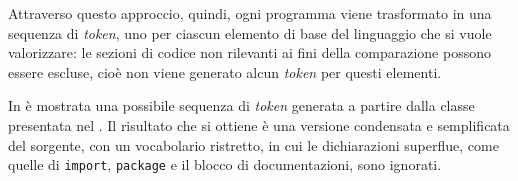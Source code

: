 
Attraverso questo approccio, quindi, ogni programma viene trasformato in una sequenza di \textit{token}, uno per ciascun elemento di base del linguaggio che si vuole valorizzare: le sezioni di codice non rilevanti ai fini della comparazione possono essere escluse, cioè non viene generato alcun \textit{token} per questi elementi.

In  è mostrata una possibile sequenza di \textit{token} generata a partire dalla classe presentata nel .
%
Il risultato che si ottiene è una versione condensata e semplificata del sorgente, con un vocabolario ristretto, in cui le dichiarazioni superflue, come quelle di \texttt{import}, \texttt{package} e il blocco di documentazioni, sono ignorati.



